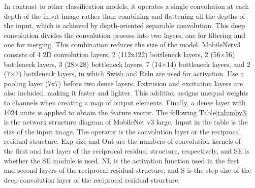 \documentclass[a4paper,fleqn]{cas-sc}
\begin{document}
In contrast to other classification models, it operates a single convolution at each depth of the input image rather than combining and flattening all the depths of the input, which is achieved by depth-oriented separable convolution. This deep convolution divides the convolution process into two layers, one for filtering and one for merging. This combination reduces the size of the model. MobileNetv3 consists of 4 2D convolution layers, 2 (112x122) bottleneck layers, 2 (56×56) bottleneck layers, 3 (28×28) bottleneck layers, 7 (14×14) bottleneck layers, and 2 (7×7) bottleneck layers, in which Swish and Relu are used for activation. Use a pooling layer (7x7) before two dense layers. Extrusion and excitation layers are also included, making it faster and lighter. This addition assigns unequal weights to channels when creating a map of output elements. Finally, a dense layer with 1024 units is applied to obtain the feature vector. The following Table\ref{tab:mbv3} is the network structure diagram of MobileNet v3 large. Input in the table is the size of the input image. The operator is the convolution layer or the reciprocal residual structure, Exp size and Out are the numbers of convolution kernels of the first and last layer of the reciprocal residual structure, respectively, and SE is whether the SE module is used. NL is the activation function used in the first and second layers of the reciprocal residual structure, and S is the step size of the deep convolution layer of the reciprocal residual structure.
\end{document}
